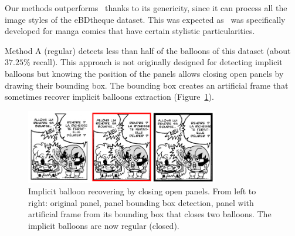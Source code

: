 

Our methods outperforms~\cite{Arai11} thanks to its genericity, since it can process all the image styles of the eBDtheque dataset.
This was expected as~\cite{Arai11} was specifically developed for manga comics that have certain stylistic particularities.

Method A (regular) detects less than half of the balloons of this dataset (about $37.25\%$ recall).
This approach is not originally designed for detecting implicit balloons but knowing the position of the panels allows closing open panels by drawing their bounding box.
The bounding box creates an artificial frame that sometimes recover implicit balloons extraction (Figure~\ref{fig:ex:implicit_balloon_recovery_by_panel}).

  \begin{figure}[h]  %
    \centering
    \includegraphics[trim= 0px 0px 0px 0px, clip, width=0.75\textwidth]{implicit_balloon_recovery.png}
    \caption[Implicit balloon recovering by closing open panels]{Implicit balloon recovering by closing open panels. From left to right: original panel, panel bounding box detection, panel with artificial frame from its bounding box that closes two balloons. The implicit balloons are now regular (closed).}
    \label{fig:ex:implicit_balloon_recovery_by_panel}
  \end{figure}

